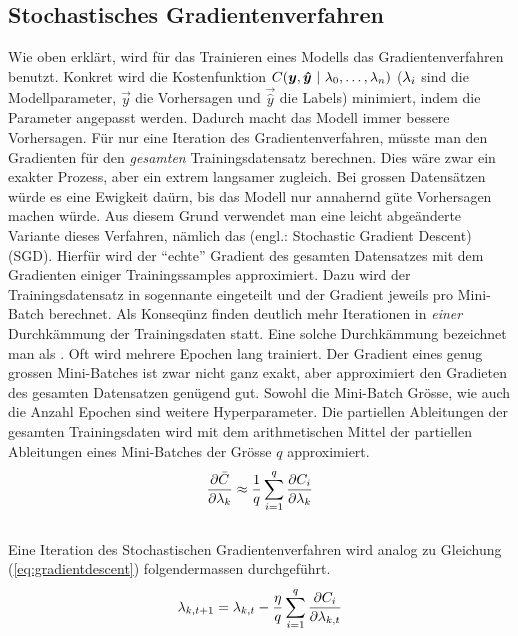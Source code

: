 \para{}
\cite{Nielsen}

\subsection{Stochastisches Gradientenverfahren}
Wie oben erklärt, wird für das Trainieren eines Modells das Gradientenverfahren benutzt.
Konkret wird die Kostenfunktion $C(\vec{y},\vec{\hat{y}}\ |\ \param_0,\ldots,\param_n)$
($\lambda_i$ sind die Modellparameter, $\vec{y}$ die Vorhersagen und $\vec{\hat{y}}$
die Labels) minimiert, indem die Parameter angepasst werden. Dadurch macht das Modell immer bessere Vorhersagen.
Für nur eine Iteration des Gradientenverfahren, müsste man den Gradienten für den
\textit{gesamten} Trainingsdatensatz berechnen.
Dies wäre zwar ein exakter Prozess, aber ein extrem langsamer zugleich.
Bei grossen Datensätzen würde es eine Ewigkeit daürn, bis das Modell nur annahernd güte Vorhersagen machen würde.
\para{}
Aus diesem Grund verwendet man eine leicht abgeänderte Variante dieses
Verfahren, nämlich das  (engl.:
Stochastic Gradient Descent) (SGD).
Hierfür wird der ``echte'' Gradient des gesamten Datensatzes mit dem Gradienten einiger Trainingssamples approximiert.
Dazu wird der Trainingsdatensatz in sogennante  eingeteilt und der Gradient jeweils pro Mini-Batch berechnet.
Als Konseqünz finden deutlich mehr Iterationen in \textit{einer}
Durchkämmung der Trainingsdaten statt. Eine solche Durchkämmung bezeichnet man als
. Oft wird mehrere Epochen lang trainiert.
Der Gradient eines genug grossen Mini-Batches ist zwar nicht ganz exakt, aber approximiert den Gradieten des gesamten Datensatzen genügend gut.
Sowohl die Mini-Batch Grösse, wie auch die Anzahl Epochen sind weitere Hyperparameter.
\para{}
Die partiellen Ableitungen der gesamten Trainingsdaten wird mit dem
arithmetischen Mittel der partiellen Ableitungen eines Mini-Batches der Grösse $q$ approximiert.
\\
\begin{equation}\label{eq:minibatch_deriv}
  \frac{\partial \bar{C}}{\partial \lambda_k} \approx \frac{1}{q}\sum_{i=1}^{q} \frac{\partial C_i}{\partial \lambda_k}
\end{equation}
\\
Eine Iteration des Stochastischen Gradientenverfahren wird analog zu Gleichung (\ref{eq:gradientdescent}) folgendermassen durchgeführt.
\\
\begin{equation}\label{eq:sgd}
  \lambda_{k,t+1} = \lambda_{k,t} - \frac{\eta}{q} \sum_{i=1}^{q} \frac{\partial C_i}{\partial \lambda_{k,t}}
\end{equation}


